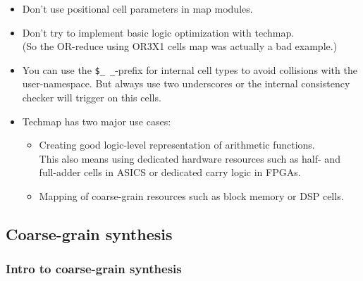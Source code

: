 \begin{frame}{\subsubsecname}
\begin{itemize}
\item Don't use positional cell parameters in map modules.
\medskip
\item Don't try to implement basic logic optimization with techmap. \\
{\small (So the OR-reduce using OR3X1 cells map was actually a bad example.)}
\medskip
\item You can use the {\tt \$\_\,\_}-prefix for internal cell types to avoid
collisions with the user-namespace. But always use two underscores or the
internal consistency checker will trigger on this cells.
\medskip
\item Techmap has two major use cases:
\begin{itemize}
\item Creating good logic-level representation of arithmetic functions. \\
This also means using dedicated hardware resources such as half- and full-adder
cells in ASICS or dedicated carry logic in FPGAs.
\smallskip
\item Mapping of coarse-grain resources such as block memory or DSP cells.
\end{itemize}
\end{itemize}
\end{frame}


\subsection{Coarse-grain synthesis}

\begin{frame}
\subsectionpage
\subsectionpagesuffix
\end{frame}

\subsubsection{Intro to coarse-grain synthesis}

